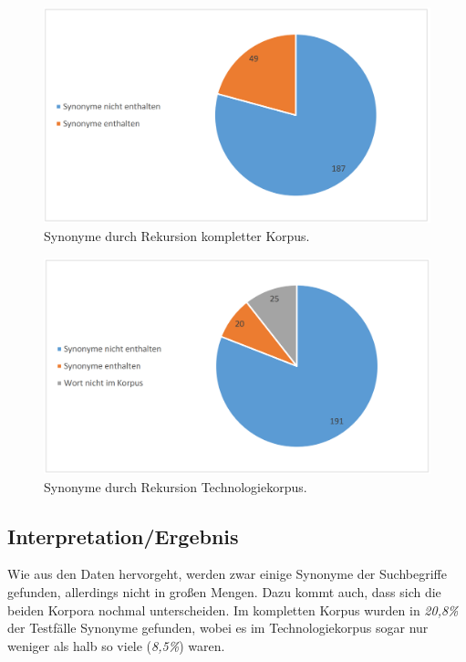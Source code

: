 \documentclass[12pt,a4paper]{report}
\begin{document}
\begin{figure}[p]
  \begin{center}
	\includegraphics[scale=0.4]{SynonymFull.PNG}
  \end{center}  
  \caption{Synonyme durch Rekursion kompletter Korpus.}

\end{figure}
 

\begin{figure}[p]
  \begin{center}
	\includegraphics[scale=0.4]{SynonymTech.PNG}
  \end{center}  
  \caption{Synonyme durch Rekursion Technologiekorpus.}
  
\end{figure}
		\subsection{Interpretation/Ergebnis}
		Wie aus den Daten hervorgeht, werden zwar einige Synonyme der Suchbegriffe gefunden, allerdings nicht in großen Mengen. Dazu kommt auch, dass sich die beiden Korpora nochmal unterscheiden. Im kompletten Korpus wurden in \textit{20,8\%} der Testfälle Synonyme gefunden, wobei es im Technologiekorpus sogar nur weniger als halb so viele (\textit{8,5\%}) waren.\\
		
\end{document}
